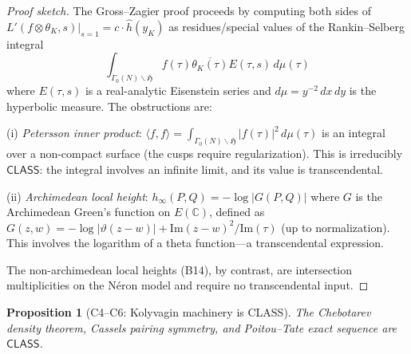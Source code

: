 \documentclass[11pt]{article}
\theoremstyle{plain}
\newtheorem{proposition}[theorem]{Proposition}
\theoremstyle{definition}
\theoremstyle{remark}
\newcommand{\C}{\mathbb{C}}
\newcommand{\CLASS}{\ensuremath{\mathsf{CLASS}}}
\newcommand{\hhat}{\hat{h}}
\begin{document}
\begin{proof}[Proof sketch]
The Gross--Zagier proof \cite{gross-zagier} proceeds by computing both sides of $L'(f \otimes \theta_K, s)\big|_{s=1} = c \cdot \hhat(y_K)$ as residues/special values of the Rankin--Selberg integral
\[
\int_{\Gamma_0(N) \backslash \mathfrak{H}} f(\tau) \overline{\theta_K(\tau)} E(\tau, s) \, d\mu(\tau)
\]
where $E(\tau, s)$ is a real-analytic Eisenstein series and $d\mu = y^{-2}\,dx\,dy$ is the hyperbolic measure. The obstructions are:

(i) \emph{Petersson inner product}: $\langle f, f \rangle = \int_{\Gamma_0(N) \backslash \mathfrak{H}} |f(\tau)|^2 \,d\mu(\tau)$ is an integral over a non-compact surface (the cusps require regularization). This is irreducibly $\CLASS$: the integral involves an infinite limit, and its value is transcendental.

(ii) \emph{Archimedean local height}: $h_\infty(P, Q) = -\log|G(P, Q)|$ where $G$ is the Archimedean Green's function on $E(\C)$, defined as $G(z, w) = -\log|\vartheta(z-w)| + \mathrm{Im}(z-w)^2/\mathrm{Im}(\tau)$ (up to normalization). This involves the logarithm of a theta function---a transcendental expression.

The non-archimedean local heights (B14), by contrast, are intersection multiplicities on the N\'eron model and require no transcendental input.
\end{proof}

\begin{proposition}[C4--C6: Kolyvagin machinery is CLASS]\label{prop:C4C6}
The Chebotarev density theorem, Cassels pairing symmetry, and Poitou--Tate exact sequence are $\CLASS$.
\end{proposition}
\end{document}
